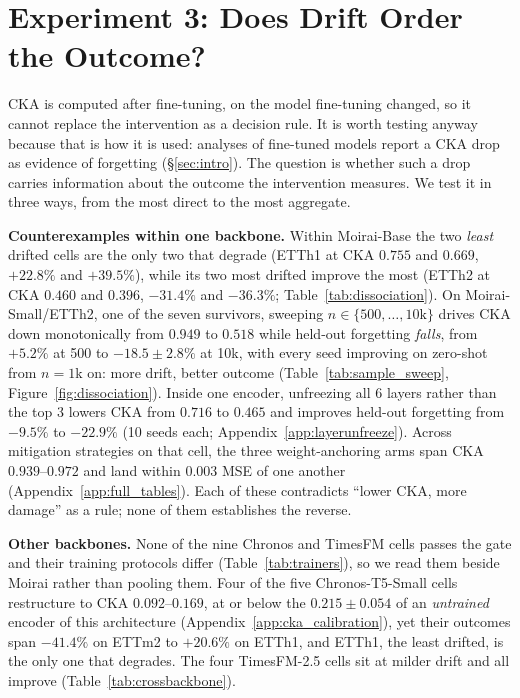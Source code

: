 \section{Experiment 3: Does Drift Order the Outcome?}
\label{sec:exp3}

CKA is computed after fine-tuning, on the model fine-tuning changed, so it cannot
replace the intervention as a decision rule.  It is worth testing anyway because
that is how it is used: analyses of fine-tuned models report a CKA drop as
evidence of forgetting (\S\ref{sec:intro}).  The question is whether such a drop
carries information about the outcome the intervention measures.  We test it in
three ways, from the most direct to the most aggregate.

\label{sec:forecasting:nonmoirai}
\textbf{Counterexamples within one backbone.}  Within Moirai-Base the two
\emph{least} drifted cells are the only two that degrade (ETTh1 at CKA $0.755$
and $0.669$, $+22.8\%$ and $+39.5\%$), while its two most drifted improve the
most (ETTh2 at CKA $0.460$ and $0.396$, $-31.4\%$ and $-36.3\%$;
Table~\ref{tab:dissociation}).  On Moirai-Small/ETTh2, one of the seven
survivors, sweeping $n{\in}\{500,\ldots,10\mathrm{k}\}$ drives CKA down
monotonically from $0.949$ to $0.518$ while held-out forgetting \emph{falls}, from
$+5.2\%$ at 500 to $-18.5{\pm}2.8\%$ at 10k, with every seed improving on
zero-shot from $n{=}1$k on: more drift, better outcome
(Table~\ref{tab:sample_sweep}, Figure~\ref{fig:dissociation}).  Inside one encoder, unfreezing all 6 layers
rather than the top 3 lowers CKA from $0.716$ to $0.465$ and improves held-out
forgetting from $-9.5\%$ to $-22.9\%$ (10 seeds each; Appendix~\ref{app:layerunfreeze}).  Across mitigation strategies
on that cell, the three weight-anchoring arms span CKA $0.939$--$0.972$ and land
within $0.003$ MSE of one another (Appendix~\ref{app:full_tables}).  Each of these
contradicts ``lower CKA, more damage'' as a rule; none of them establishes the
reverse.

\textbf{Other backbones.}  None of the nine Chronos and TimesFM cells passes the
gate and their training protocols differ (Table~\ref{tab:trainers}), so we read
them beside Moirai rather than pooling them.  Four of the five Chronos-T5-Small
cells restructure to CKA $0.092$--$0.169$, at or below the $0.215{\pm}0.054$ of an
\emph{untrained} encoder of this architecture (Appendix~\ref{app:cka_calibration}),
yet their outcomes span $-41.4\%$ on ETTm2 to $+20.6\%$ on ETTh1, and ETTh1, the
least drifted, is the only one that degrades.  The four TimesFM-2.5 cells sit at
milder drift and all improve (Table~\ref{tab:crossbackbone}).

